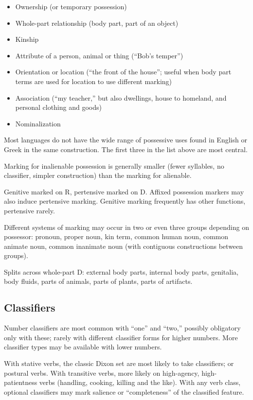 \documentclass[11pt]{article}
\newenvironment{grammarlist}%
 {\begin{itemize}\addtolength{\itemsep}{-0.5\baselineskip}\ignorespaces}%
 {\end{itemize}\ignorespacesafterend}
\begin{document}
\begin{grammarlist}
  \item Ownership (or temporary possession)
  \item Whole-part relationship (body part, part of an object)
  \item Kinship
  \item Attribute of a person, animal or thing (``Bob's temper'')
  \item Orientation or location (``the front of the house''; useful
    when body part terms are used for location to use different
    marking)
  \item Association (``my teacher,'' but also dwellings, house to
    homeland, and personal clothing and goods)
  \item Nominalization
\end{grammarlist}

\noindent Most languages do not have the wide range of possessive uses
found in English or Greek in the same construction.  The first three
in the list above are most central.

Marking for inalienable possession is generally smaller (fewer
syllables, no classifier, simpler construction) than the marking for
alienable.

Genitive marked on R, pertensive marked on D.  Affixed possession
markers may also induce pertensive marking.  Genitive marking
frequently has other functions, pertensive rarely.

Different systems of marking may occur in two or even three groups
depending on possessor: pronoun, proper noun, kin term, common human
noun, common animate noun, common inanimate noun (with contiguous
constructions between groups).

Splits across whole-part D: external body parts, internal body parts,
genitalia, body fluids, parts of animals, parts of plants, parts of
artifacts. 

\subsection{Classifiers}
Number classifiers are most common with ``one'' and ``two,'' possibly
obligatory only with these; rarely with different classifier forms for
higher numbers.  More classifier types may be available with lower
numbers.

With stative verbs, the classic Dixon set are most likely to take
classifiers; or postural verbs.  With transitive verbs, more likely on
high-agency, high-patientness verbs (handling, cooking, killing and
the like).  With any verb class, optional classifiers may mark
salience or ``completeness'' of the classified feature.
\end{document}
